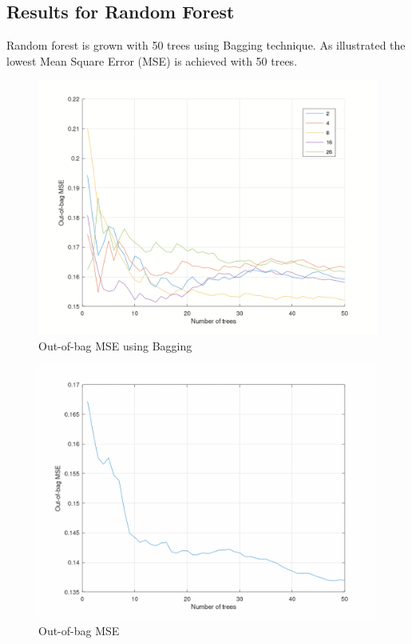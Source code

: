 \documentclass{article}
\begin{document}
\vfill
\clearpage

\subsection{Results for Random Forest}
Random forest is grown with 50 trees using Bagging technique. As illustrated the lowest Mean Square Error (MSE) is achieved with 50 trees.
\bigskip
\begin{figure}[H]
	\includegraphics[width=\textwidth,height=\textheight,keepaspectratio]{mse_bagging.png}
	\caption{Out-of-bag MSE using Bagging}
\end{figure}

\begin{figure}[H]
	\includegraphics[width=\textwidth,height=\textheight,keepaspectratio]{mse.png}
	\caption{Out-of-bag MSE}
\end{figure}
\end{document}

